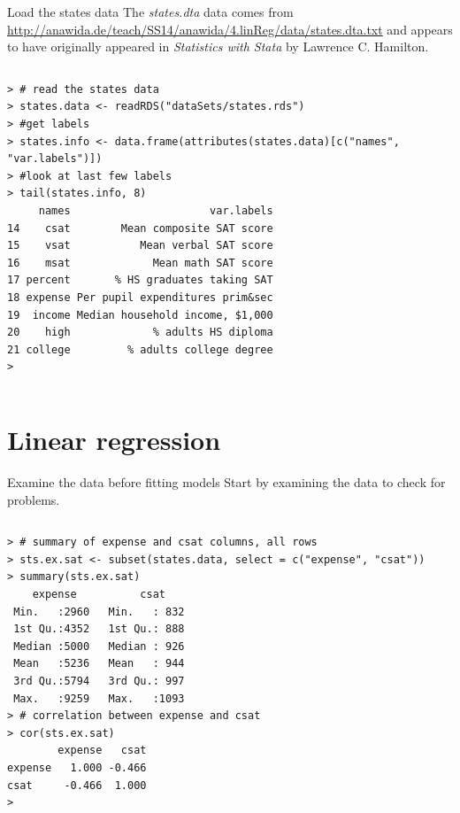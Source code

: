 \documentclass[table,smaller]{beamer}
\begin{document}
\begin{frame}[fragile,label=sec-1-5]{Load the states data}
 The \emph{states.dta} data comes from \url{http://anawida.de/teach/SS14/anawida/4.linReg/data/states.dta.txt} and appears to have originally appeared in \emph{Statistics with Stata} by Lawrence C. Hamilton.
\vspace{-.5em}
\begin{columns}
\begin{block}{}
\begin{verbatim}
> # read the states data
> states.data <- readRDS("dataSets/states.rds") 
> #get labels
> states.info <- data.frame(attributes(states.data)[c("names", "var.labels")])
> #look at last few labels
> tail(states.info, 8)
     names                      var.labels
14    csat        Mean composite SAT score
15    vsat           Mean verbal SAT score
16    msat             Mean math SAT score
17 percent       % HS graduates taking SAT
18 expense Per pupil expenditures prim&sec
19  income Median household income, $1,000
20    high             % adults HS diploma
21 college         % adults college degree
>
\end{verbatim}
\end{block}
\end{columns}
\vspace{.5em}
\end{frame}


\section{Linear regression}
\label{sec-2}

\begin{frame}[fragile,label=sec-2-1]{Examine the data before fitting models}
 Start by examining the data to check for problems.

\vspace{-.5em}
\begin{columns}
\begin{block}{}
\begin{verbatim}
> # summary of expense and csat columns, all rows
> sts.ex.sat <- subset(states.data, select = c("expense", "csat"))
> summary(sts.ex.sat)
    expense          csat     
 Min.   :2960   Min.   : 832  
 1st Qu.:4352   1st Qu.: 888  
 Median :5000   Median : 926  
 Mean   :5236   Mean   : 944  
 3rd Qu.:5794   3rd Qu.: 997  
 Max.   :9259   Max.   :1093  
> # correlation between expense and csat
> cor(sts.ex.sat) 
        expense   csat
expense   1.000 -0.466
csat     -0.466  1.000
>
\end{verbatim}
\end{block}
\end{columns}
\vspace{.5em}
\end{frame}
\end{document}
